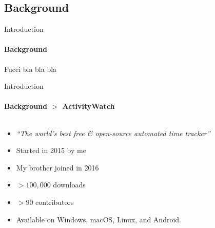 \documentclass[xcolor={dvipsnames,table}]{beamer}
\newif\ifplacelogo{}  %
\begin{document}
\subsection{Background}
\begin{frame}{Introduction}
    \framesubtitle{Background}

    Fucci bla bla bla
\end{frame}

\placelogofalse{}
\begin{frame}{Introduction}
    \framesubtitle{Background $>$ ActivityWatch}

    \begin{columns}
        \begin{column}{0.5\textwidth}
            \vspace{1em}

            \begin{itemize}
                \item{\emph{``The world's best free \& open-source automated time tracker''}}
                \item Started in 2015 by me
                \item My brother joined in 2016
                \item $>100{,}000$ downloads
                \item $>90$ contributors
                \item Available on Windows, macOS, Linux, and Android.
            \end{itemize}


\end{column}
\end{columns}
\end{frame}
\end{document}
